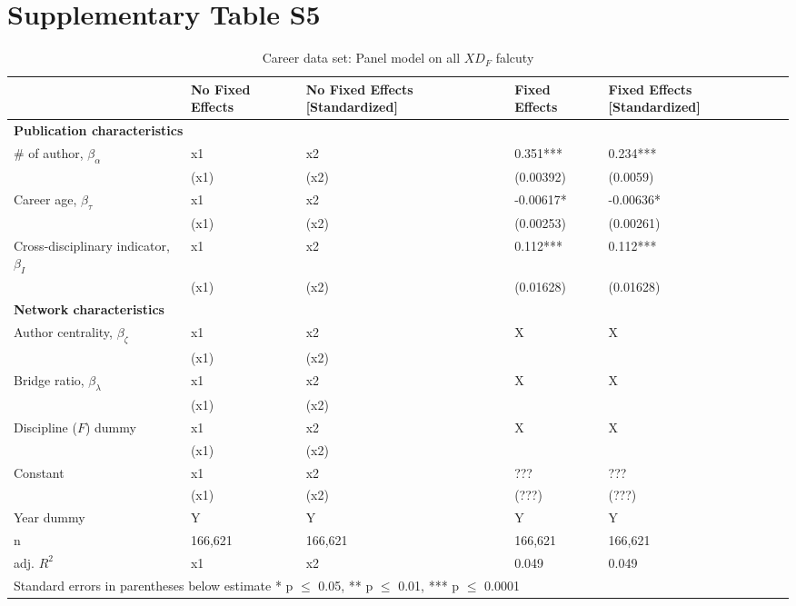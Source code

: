 \documentclass[10pt]{article}          %
\begin{document}
\newpage
\section{Supplementary Table S5}
\begin{table}[h]
\begin{tabular}{m{5cm} m{3.0cm} m{3cm} m{2.5cm} m{2.7cm}}
\hline
\hline
& \textbf{No Fixed Effects} & \textbf{No Fixed Effects [Standardized]} & \textbf{Fixed Effects} & \textbf{Fixed Effects [Standardized]} \\ \hline
\multicolumn{5}{l}{\textbf{Publication characteristics}} \\
\rowcolor{lightgray}
{\# of author, $\beta_\alpha$} & x1 & x2 & 0.351*** & 0.234*** \\
                             & (x1) & (x2) & (0.00392) & (0.0059) \\
\rowcolor{lightgray}
{Career age, $\beta_\tau$} & x1 & x2 & -0.00617* & -0.00636* \\
                         & (x1) & (x2) & (0.00253) & (0.00261) \\
\rowcolor{lightgray}
{Cross-disciplinary indicator, $\beta_I$} & x1 & x2 &  0.112*** & 0.112*** \\
                                        & (x1) & (x2) & (0.01628) & (0.01628) \\ \hline
\multicolumn{5}{l}{\textbf{Network characteristics}} \\
\rowcolor{lightgray}
{Author centrality, $\beta_\zeta$} & x1 & x2 & X & X \\
                             & (x1) & (x2) &  &  \\
\rowcolor{lightgray}
{Bridge ratio, $\beta_\lambda$} & x1 & x2 & X & X \\
                             & (x1) & (x2) & & \\
\rowcolor{lightgray}
{Discipline ($F$) dummy}     & x1 & x2 & X & X \\
                             & (x1) & (x2) & & \\
\rowcolor{lightgray}
{Constant}                 & x1 & x2 & ??? & ??? \\
                         & (x1) & (x2) & (???) & (???) \\
\rowcolor{lightgray}
{Year dummy}            & Y & Y & Y & Y \\ \hline
\rowcolor{lightgray}
{n}                      & 166,621 & 166,621 & 166,621 & 166,621 \\
\rowcolor{lightgray}
{adj. $R^2$}             & x1 & x2 & 0.049 & 0.049 \\ \hline \hline
\multicolumn{5}{l}{\footnotesize{Standard errors in parentheses below estimate * p $\leq$ 0.05, ** p $\leq$ 0.01, *** p $\leq$ 0.0001}}

\end{tabular}
\caption{Career data set: Panel model on all $XD_F$ falcuty}
\label{tbl:sT5}
\end{table}

\bigskip   %
\end{document}
